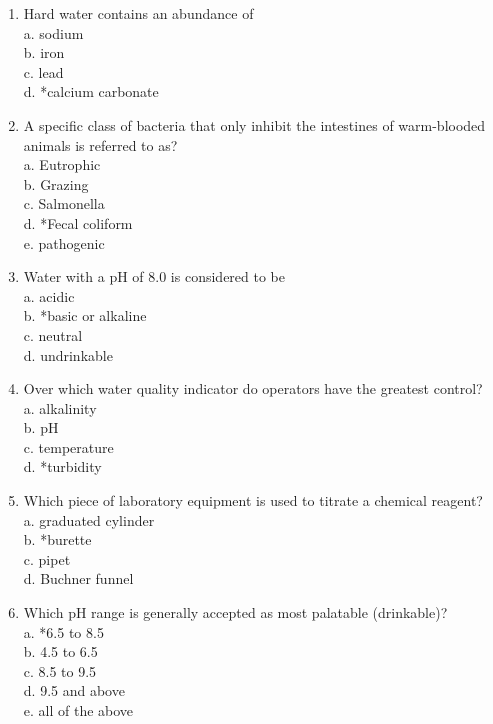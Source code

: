 
\begin{enumerate}[1.]










  \item Hard water contains an abundance of\\
a. sodium\\
b. iron\\
c. lead\\
d. *calcium carbonate\\

  \item A specific class of bacteria that only inhibit the intestines of warm-blooded animals is referred to as?\\
a. Eutrophic\\
b. Grazing\\
c. Salmonella\\
d. *Fecal coliform\\
e. pathogenic\\


\item Water with a $\mathrm{pH}$ of 8.0 is considered to be\\
a. acidic\\
b. *basic or alkaline\\
c. neutral\\
d. undrinkable\\

  \item Over which water quality indicator do operators have the greatest control?\\
a. alkalinity\\
b. $\mathrm{pH}$\\
c. temperature\\
d. *turbidity\\
  \item Which piece of laboratory equipment is used to titrate a chemical reagent?\\
a. graduated cylinder\\
b. *burette\\
c. pipet\\
d. Buchner funnel\\
  \item Which $\mathrm{pH}$ range is generally accepted as most palatable (drinkable)?\\
a. *6.5 to 8.5\\
b. 4.5 to 6.5\\
c. 8.5 to 9.5\\
d. 9.5 and above\\
e. all of the above 


\end{enumerate}
